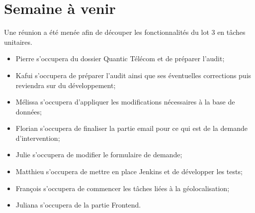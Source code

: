 \documentclass [a4paper] {article}
\begin{document}
\section{Semaine à venir}
Une réunion a été menée afin de découper les fonctionnalités du lot 3 en tâches unitaires.
\begin{itemize}
\item Pierre s'occupera du dossier Quantic Télécom et de préparer l'audit;
\item Kafui s'occupera de préparer l'audit ainsi que ses éventuelles corrections puis reviendra sur du développement;
\item Mélissa s'occupera d'appliquer les modifications nécessaires à la base de données;
\item Florian s'occupera de finaliser la partie email pour ce qui est de la demande d'intervention;
\item Julie s'occupera de modifier le formulaire de demande;
\item Matthieu s'occupera de mettre en place Jenkins et de développer les tests;
\item François s'occupera de commencer les tâches liées à la géolocalisation;
\item Juliana s'occupera de la partie Frontend.
\end{itemize}



\end{document}
